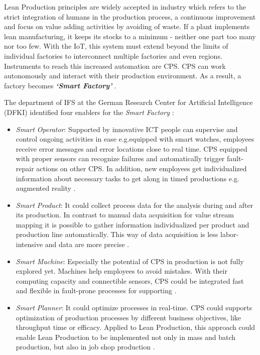 Lean Production principles are widely accepted in industry which refers to the strict integration of humans in the production process, a continuous improvement and focus on value adding activities by avoiding of waste. If a plant implements lean manufacturing, it keeps its stocks to a minimum - neither one part too many nor too few. With the \acs{IoT}, this system must extend beyond the limits of individual factories to interconnect multiple factories and even regions. Instruments to reach this increased automation are \acs{CPS}. \acs{CPS} can work autonomously and interact with their production environment. As a result, a factory becomes \textbf{\textit{‘Smart Factory’}} \cite{LEANKOLBERG,IOTMANU}.

The department of \acs{IFS} at the German Research Center for Artificial Intelligence (\acs{DFKI}) identified four enablers for the \textit{Smart Factory} \cite{LEANKOLBERG}: 
\begin{itemize}
	\item \textit{Smart Operator}: Supported by innovative \acs{ICT} people can supervise and control ongoing activities in ease e.g.equipped with smart watches, employees receive error messages and error locations close to real time. \acs{CPS} equipped with proper sensors can recognize failures and automatically trigger fault-repair actions on other \acs{CPS}. In addition, new employees get individualized information about necessary tasks to get along in timed productions e.g. augmented reality \cite{LEANKOLBERG}.
	\item \textit{Smart Product}: It could collect process data for the analysis during and after its production. In contrast to manual data acquisition for value stream mapping it is possible to gather information individualized per product and production line automatically. This way of data acquisition is less labor-intensive and data are more precise \cite{LEANKOLBERG}.
	\item \textit{Smart Machine}: Especially the potential of \acs{CPS} in production is not fully explored yet. Machines help employees to avoid mistakes. With their computing capacity and connectible sensors, \acs{CPS} could be integrated fast and flexible in fault-prone processes for supporting \cite{LEANKOLBERG}.
	\item \textit{Smart Planner}: It could optimize processes in real-time. \acs{CPS} could supports optimization of production processes by different business objectives, like throughput time or efficacy. Applied to Lean Production, this approach could enable Lean Production to be implemented not only in mass and batch production, but also in job shop production \cite{LEANKOLBERG}.
\end{itemize}

